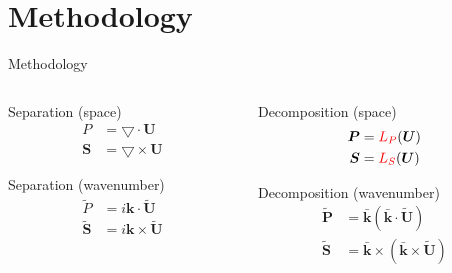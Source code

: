 \documentclass[aspectratio=43]{beamer}
\begin{document}
\section{Methodology}
\begin{frame}{Methodology}

\begin{columns}
  \begin{column}{0.50\textwidth}

\begin{block}{Separation (space)}
\begin{equation}
\begin{aligned}
P&=\bigtriangledown \cdot \boldsymbol{U} \\
\boldsymbol{S}&=\bigtriangledown \times \boldsymbol{U}
\end{aligned}
\end{equation}
\end{block}

\begin{block}{Separation (wavenumber)}
\begin{equation}
\begin{aligned}
\tilde{P}&=i\mathrm{\boldsymbol{k}} \cdot \boldsymbol{\tilde{U}} \\
\boldsymbol{\tilde{S}}&=i \mathrm{\boldsymbol{k}} \times \boldsymbol{\tilde{U}}
\end{aligned}
\end{equation}
\end{block}
\end{column}


\begin{column}{0.50\textwidth}

\begin{block}{Decomposition (space)}
\begin{equation}
\begin{aligned}
\boldsymbol{P}&=\textcolor{red}{L_P} (\boldsymbol{U}) \\
\boldsymbol{S}&= \textcolor{red}{L_S} (\boldsymbol{U})
\end{aligned}
\end{equation}
\end{block}

\begin{block}{Decomposition (wavenumber)}
\begin{equation}
\begin{aligned}
\boldsymbol{\tilde{P}}&=\mathrm{\bar{\boldsymbol{k}}} (\mathrm{\bar{\boldsymbol{k}}} \cdot \boldsymbol{\tilde{U}}) \\
\boldsymbol{\tilde{S}}&= \mathrm{\bar{\boldsymbol{k}}} \times (\mathrm{\bar{\boldsymbol{k}}} \times \boldsymbol{\tilde{U}})
\end{aligned}
\end{equation}
\end{block}
\end{column}
\end{columns}
\end{frame}
\end{document}
